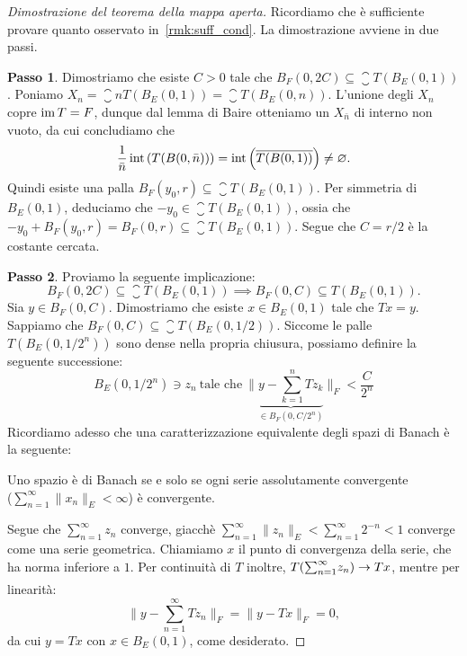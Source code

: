 \begin{proof}[Dimostrazione del teorema della mappa aperta]
	Ricordiamo che è sufficiente provare quanto osservato in~\ref{rmk:suff_cond}. La dimostrazione avviene in due passi.

	\textbf{Passo 1}. Dimostriamo che esiste $C>0$ tale che $B_F(0, 2C) \subseteq \closure{T(B_E(0, 1))}$.
	Poniamo $X_n = \closure{n T(B_E(0,1))} = \closure{T(B_E(0,n))}$. L'unione degli $X_n$ copre $\operatorname{im} T = F$, dunque dal lemma di Baire otteniamo un $X_{\bar n}$ di interno non vuoto, da cui concludiamo che
	\begin{equation*}
		\frac1{\bar n} \operatorname{int}\left(T(B(0,\bar n))\right) = \operatorname{int}\left(\overline{T(B(0,1))}\right) \neq \varnothing.
	\end{equation*}
	Quindi esiste una palla $B_F(y_0, r) \subseteq \closure{T(B_E(0,1))}$. Per simmetria di $B_E(0,1)$, deduciamo che $-y_0 \in \closure{T(B_E(0,1))}$, ossia che $-y_0 + B_F(y_0, r) = B_F(0, r) \subseteq \closure{T(B_E(0,1))}$. Segue che $C=r/2$ è la costante cercata.

	\textbf{Passo 2}. Proviamo la seguente implicazione:
	\begin{equation*}
		B_F(0,2C) \subseteq \closure{T(B_E(0,1))} \implies B_F(0, C) \subseteq T(B_E(0,1)).
	\end{equation*}
	Sia $y \in B_F(0,C)$. Dimostriamo che esiste $x \in B_E(0,1)$ tale che $Tx = y$. Sappiamo che $B_F(0, C) \subseteq \closure{T(B_E(0,1/2))}$.
	Siccome le palle $T(B_E(0,1/2^n))$ sono dense nella propria chiusura, possiamo definire la seguente successione:
	\begin{equation*}
		B_E(0,1/2^n) \ni z_n \ \text{tale che}\ \|\underbrace{y - {\textstyle \sum_{k=1}^n} Tz_k}_{\in B_F(0, C/2^n)}\|_F < \frac{C}{2^n}
	\end{equation*}
	Ricordiamo adesso che una caratterizzazione equivalente degli spazi di Banach è la seguente:
	\begin{center}
		Uno spazio è di Banach se e solo se ogni serie assolutamente convergente\\
		($\sum_{n=1}^\infty \|x_n\|_E < \infty$) è convergente.
	\end{center}
	Segue che $\sum_{n=1}^\infty z_n$ converge, giacchè $\sum_{n=1}^\infty \|z_n\|_E < \sum_{n=1}^\infty 2^{-n} < 1$ converge come una serie geometrica. Chiamiamo $x$ il punto di convergenza della serie, che ha norma inferiore a $1$.
	Per continuità di $T$ inoltre, $T({\textstyle \sum_{n=1}^\infty} z_n) \underset{{}}{\rightarrow} Tx$, mentre per linearità:
	\begin{equation*}
		\|y- {\textstyle \sum_{n=1}^\infty} Tz_n\|_F = \|y- Tx\|_F = 0,
	\end{equation*}
	da cui $y = Tx$ con $x \in B_E(0,1)$, come desiderato.
\end{proof}


